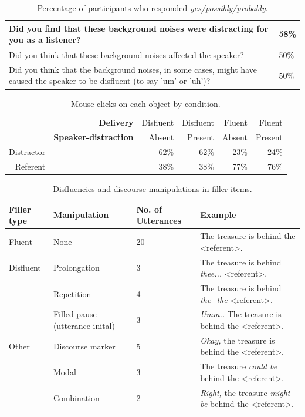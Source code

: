 \documentclass[man]{apa6}
\begin{document}




\newpage

\begin{table}[ht]
\centering
\begin{tabularx}{\linewidth}{|X|X|}
	\hline
Did you find that these background noises were distracting for you as a listener? & 58\%\\ 
   \hline
Did you think that these background noises affected the speaker? & 50\%\\
   \hline
Did you think that the background noises, in some cases, might have caused the speaker to be disfluent (to say 'um' or 'uh')? & 50\%\\
   \hline
\end{tabularx}
\caption{Percentage of participants who responded \textit{yes/possibly/probably}.}
\label{table:questions}
\end{table}


\begin{table}[ht]
\centering
\begin{tabular}{rrrrrr}
  \hline
& \textbf{Delivery} & Disfluent & Disfluent & Fluent & Fluent \\ 
& \textbf{Speaker-distraction} & Absent & Present & Absent & Present \\
  \hline
Distractor & &  62\% &  62\% &  23\% &  24\% \\ 
  Referent & &  38\% &  38\% &  77\% &  76\% \\ 
   \hline
\end{tabular}
\caption{Mouse clicks on each object by condition.}
\label{table:objctclck}
\end{table}


\begin{table}
\begin{tabularx}{\linewidth}{|X|X|X|X|}
  \hline
Filler type & Manipulation & No. of Utterances & Example \\
  \hline
Fluent & None & 20 & The treasure is behind the \textless referent\textgreater . \\
Disfluent & Prolongation & 3 & The treasure is behind \textit{thee...} \textless referent\textgreater . \\
& Repetition & 4 & The treasure is behind \textit{the- the} \textless referent\textgreater .\\
& Filled pause (utterance-inital) & 3 & \textit{Umm..} The treasure is behind the \textless referent\textgreater .\\
Other & Discourse marker & 5 & \textit{Okay,} the treasure is behind the \textless referent\textgreater .\\
& Modal & 3 & The treasure \textit{could be} behind the \textless referent\textgreater .\\ 
& Combination & 2 & \textit{Right,} the treasure \textit{might be} behind the \textless referent\textgreater .\\
   \hline
\end{tabularx}
\caption{Disfluencies and discourse manipulations in filler items.}
\label{table:fillers}
\end{table}
\end{document}
